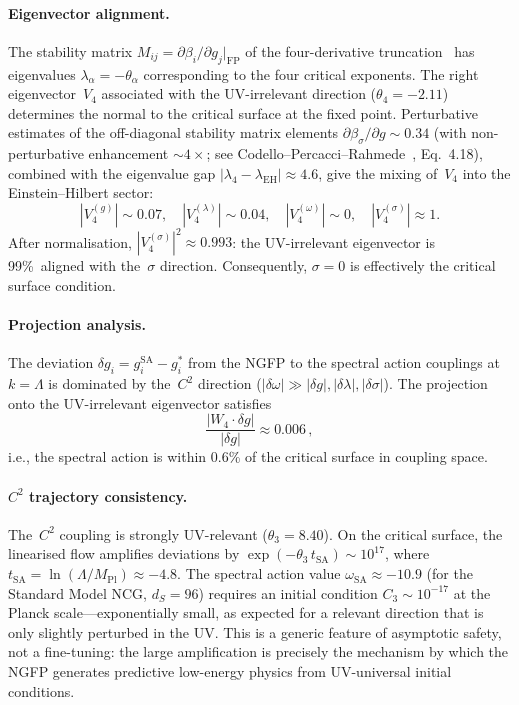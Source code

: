 \paragraph{Eigenvector alignment.}
The stability matrix $M_{ij} = \partial \beta_i / \partial g_j |_{\mathrm{FP}}$ of the four-derivative truncation~\cite{ch4:Benedetti2010} has eigenvalues $\lambda_\alpha = -\theta_\alpha$ corresponding to the four critical exponents. The right eigenvector~$V_4$ associated with the UV-irrelevant direction ($\theta_4 = -2.11$) determines the normal to the critical surface at the fixed point. Perturbative estimates of the off-diagonal stability matrix elements $\partial \beta_\sigma / \partial g \sim 0.34$ (with non-perturbative enhancement $\sim 4\times$; see Codello--Percacci--Rahmede~\cite{ch4:Codello2009}, Eq.~4.18), combined with the eigenvalue gap $|\lambda_4 - \lambda_{\mathrm{EH}}| \approx 4.6$, give the mixing of~$V_4$ into the Einstein--Hilbert sector:
\begin{equation}
  |V_4^{(g)}| \sim 0.07, \quad |V_4^{(\lambda)}| \sim 0.04, \quad |V_4^{(\omega)}| \sim 0, \quad |V_4^{(\sigma)}| \approx 1.
  \label{eq:4-v4-alignment}
\end{equation}
After normalisation, $|V_4^{(\sigma)}|^2 \approx 0.993$: the UV-irrelevant eigenvector is 99\%~aligned with the~$\sigma$ direction. Consequently, $\sigma = 0$ is effectively the critical surface condition.

\paragraph{Projection analysis.}
The deviation $\delta g_i = g_i^{\mathrm{SA}} - g_i^*$ from the NGFP to the spectral action couplings at $k = \Lambda$ is dominated by the~$C^2$ direction ($|\delta\omega| \gg |\delta g|, |\delta\lambda|, |\delta\sigma|$). The projection onto the UV-irrelevant eigenvector satisfies
\begin{equation}
  \frac{|W_4 \cdot \delta g|}{|\delta g|} \approx 0.006\,,
  \label{eq:4-projection}
\end{equation}
i.e., the spectral action is within 0.6\% of the critical surface in coupling space.

\paragraph{$C^2$ trajectory consistency.}
The~$C^2$ coupling is strongly UV-relevant ($\theta_3 = 8.40$). On the critical surface, the linearised flow amplifies deviations by $\exp(-\theta_3\, t_{\mathrm{SA}}) \sim 10^{17}$, where $t_{\mathrm{SA}} = \ln(\Lambda / M_{\mathrm{Pl}}) \approx -4.8$. The spectral action value $\omega_{\mathrm{SA}} \approx -10.9$ (for the Standard Model NCG, $d_S = 96$) requires an initial condition $C_3 \sim 10^{-17}$ at the Planck scale---exponentially small, as expected for a relevant direction that is only slightly perturbed in the UV. This is a generic feature of asymptotic safety, not a fine-tuning: the large amplification is precisely the mechanism by which the NGFP generates predictive low-energy physics from UV-universal initial conditions.

